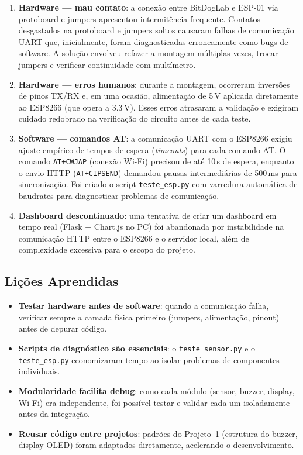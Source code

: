\documentclass[12pt, a4paper]{article}
\begin{document}
\begin{enumerate}
  \item \textbf{Hardware --- mau contato}: a conexão entre BitDogLab e ESP-01 via protoboard e jumpers apresentou intermitência frequente. Contatos desgastados na protoboard e jumpers soltos causaram falhas de comunicação UART que, inicialmente, foram diagnosticadas erroneamente como bugs de software. A solução envolveu refazer a montagem múltiplas vezes, trocar jumpers e verificar continuidade com multímetro.

  \item \textbf{Hardware --- erros humanos}: durante a montagem, ocorreram inversões de pinos TX/RX e, em uma ocasião, alimentação de 5\,V aplicada diretamente ao ESP8266 (que opera a 3.3\,V). Esses erros atrasaram a validação e exigiram cuidado redobrado na verificação do circuito antes de cada teste.

  \item \textbf{Software --- comandos AT}: a comunicação UART com o ESP8266 exigiu ajuste empírico de tempos de espera (\textit{timeouts}) para cada comando AT. O comando \texttt{AT+CWJAP} (conexão Wi-Fi) precisou de até 10\,s de espera, enquanto o envio HTTP (\texttt{AT+CIPSEND}) demandou pausas intermediárias de 500\,ms para sincronização. Foi criado o script \texttt{teste\_esp.py} com varredura automática de baudrates para diagnosticar problemas de comunicação.

  \item \textbf{Dashboard descontinuado}: uma tentativa de criar um dashboard em tempo real (Flask + Chart.js no PC) foi abandonada por instabilidade na comunicação HTTP entre o ESP8266 e o servidor local, além de complexidade excessiva para o escopo do projeto.
\end{enumerate}

\subsection{Lições Aprendidas}

\begin{itemize}
  \item \textbf{Testar hardware antes de software}: quando a comunicação falha, verificar sempre a camada física primeiro (jumpers, alimentação, pinout) antes de depurar código.
  \item \textbf{Scripts de diagnóstico são essenciais}: o \texttt{teste\_sensor.py} e o \texttt{teste\_esp.py} economizaram tempo ao isolar problemas de componentes individuais.
  \item \textbf{Modularidade facilita debug}: como cada módulo (sensor, buzzer, display, Wi-Fi) era independente, foi possível testar e validar cada um isoladamente antes da integração.
  \item \textbf{Reusar código entre projetos}: padrões do Projeto~1 (estrutura do buzzer, display OLED) foram adaptados diretamente, acelerando o desenvolvimento.
\end{itemize}
\end{document}
